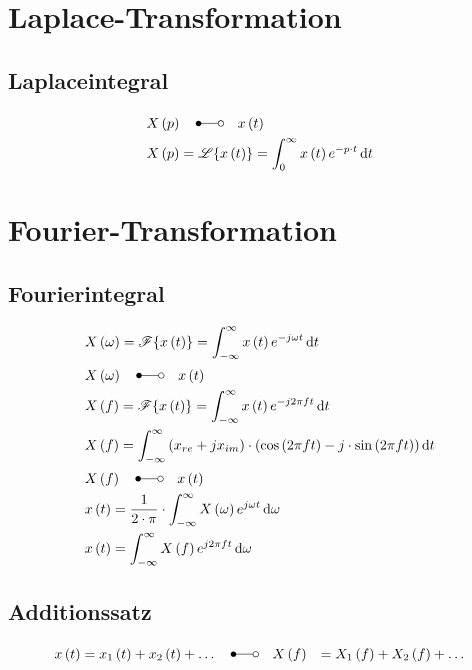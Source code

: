 \section*{Laplace-Transformation}

\subsection*{Laplaceintegral}
\begin{align*}
&X\left(p\right) \quad \Laplace \quad x\left(t\right)\\
&X\left(p\right) =\mathscr{L}\{x\left(t\right)\}=\int_{0}^{\infty}x\left(t\right)e^{-p\cdot t}\diff
t
\end{align*}

\section*{Fourier-Transformation}

\subsection*{Fourierintegral}
\begin{align*}
&X\left(\omega\right)=\mathscr{F}\{x\left(t\right)\}=\int_{-\infty}^{\infty}x\left(t\right)e^{-j\omega t}\diff t\\
&X\left(\omega\right) \quad \Laplace \quad x\left(t\right)\\
&X\left(f\right) =\mathscr{F}\{x\left(t\right)\}=\int_{-\infty}^{\infty}x\left(t\right)e^{-j2\pi f
t}\diff t\\
&X\left(f\right) =\int_{-\infty}^\infty\left(x_{re}+jx_{im}\right)\cdot\left(\cos\left(2\pi f
t\right)-j\cdot\sin\left(2\pi f t\right)\right)\diff t\\
&X\left(f\right) \quad \Laplace \quad x\left(t\right)\\
&x\left(t\right) =\frac{1}{2\cdot\pi}\cdot\int_{-\infty}^{\infty}X\left(\omega\right)e^{j\omega
t}\diff \omega\\
&x\left(t\right) =\int_{-\infty}^{\infty}X\left(f \right)e^{j2\pi f t}\diff \omega
\end{align*}

\subsection*{Additionssatz}
\begin{align*}
x\left(t\right) &=x_1\left(t\right)+x_2\left(t\right)+\dots \quad \Laplace \quad
X\left(f\right) &=X_1\left(f\right)+X_2\left(f\right)+\dots
\end{align*}

